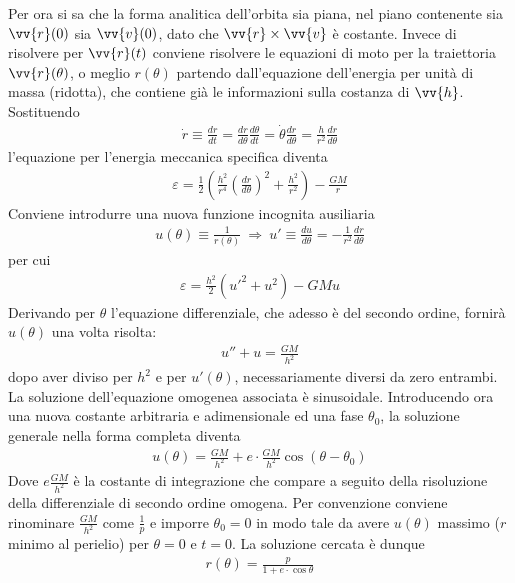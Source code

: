 \documentclass[a4paper, oneside]{book}
\begin{document}
Per ora si sa che la forma analitica dell'orbita sia piana, nel piano 
contenente sia $\vv{r}(0)$ sia $\vv{v}(0)$, dato che $\vv{r} \times \vv{v}$
è costante. Invece di risolvere per $\vv{r}(t)$ conviene risolvere le equazioni di moto 
per la traiettoria $\vv{r}(\theta)$, o meglio $r(\theta)$ partendo 
dall'equazione dell'energia per unità di massa (ridotta), che contiene
già le informazioni sulla costanza di $\vv{h}$. Sostituendo 
\begin{gather*}
    \dot{r} \equiv \frac{dr}{dt} = \frac{dr}{d\theta} \frac{d\theta}{dt} = \dot{\theta} \frac{dr}{d\theta} = \frac{h}{r^{2}} \frac{dr}{d\theta}  
\end{gather*}
l'equazione per l'energia meccanica specifica diventa 
\begin{align}
    \varepsilon = \frac{1}{2}\left(\frac{h^{2}}{r^{4}} \left(\frac{dr}{d\theta}\right)^{2} + \frac{h^{2}}{r^{2}}\right) - \frac{GM}{r}
\end{align}
Conviene introdurre una nuova funzione incognita 
ausiliaria 
\begin{gather*}
    u(\theta) \equiv \frac{1}{r(\theta)} \ \Longrightarrow \ u' \equiv \frac{du}{d\theta} = - \frac{1}{r^{2}} \frac{dr}{d\theta}
\end{gather*}
per cui 
\begin{gather*}
    \varepsilon = \frac{h^{2}}{2} (u'^{2} + u^{2}) - GMu
\end{gather*}
Derivando per $\theta$ l'equazione differenziale, che adesso è del 
secondo ordine, fornirà $u(\theta)$ una volta risolta: 
\begin{align}
    \boxed{u'' + u = \frac{GM}{h^{2}}}
\end{align}
dopo aver diviso per $h^{2}$ e per $u'(\theta)$, necessariamente diversi da 
zero entrambi. La soluzione dell'equazione omogenea associata è sinusoidale. 
Introducendo ora una nuova costante arbitraria e adimensionale ed una fase
$\theta_0$, la soluzione generale nella forma completa diventa
\begin{gather*}
    u(\theta) = \frac{GM}{h^{2}} + e\cdot \frac{GM}{h^{2}}\cos(\theta - \theta_0)
\end{gather*}
Dove $e \frac{GM}{h^{2}}$ è la costante di integrazione che compare a seguito della risoluzione 
della differenziale di secondo ordine omogena. Per convenzione conviene rinominare $\frac{GM}{h^{2}}$ come $\frac{1}{p}$ e imporre $\theta_0 = 0$
in modo tale da avere $u(\theta)$ massimo ($r$ minimo al perielio) per $\theta = 0$ e $t = 0$.
La soluzione cercata è dunque 
\begin{align}
    \boxed{r(\theta) = \frac{p}{1 + e\cdot \cos\theta}}
\end{align}
\end{document}
